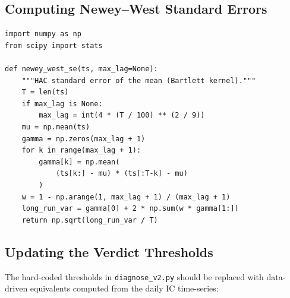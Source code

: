 \documentclass[11pt,a4paper]{article}
\theoremstyle{definition}
\begin{document}
\subsection{Computing Newey--West Standard Errors}

\begin{verbatim}
import numpy as np
from scipy import stats

def newey_west_se(ts, max_lag=None):
    """HAC standard error of the mean (Bartlett kernel)."""
    T = len(ts)
    if max_lag is None:
        max_lag = int(4 * (T / 100) ** (2 / 9))
    mu = np.mean(ts)
    gamma = np.zeros(max_lag + 1)
    for k in range(max_lag + 1):
        gamma[k] = np.mean(
            (ts[k:] - mu) * (ts[:T-k] - mu)
        )
    w = 1 - np.arange(1, max_lag + 1) / (max_lag + 1)
    long_run_var = gamma[0] + 2 * np.sum(w * gamma[1:])
    return np.sqrt(long_run_var / T)
\end{verbatim}

\subsection{Updating the Verdict Thresholds}

The hard-coded thresholds in \texttt{diagnose\_v2.py} should be
replaced with data-driven equivalents computed from the daily IC
time-series:
\end{document}
